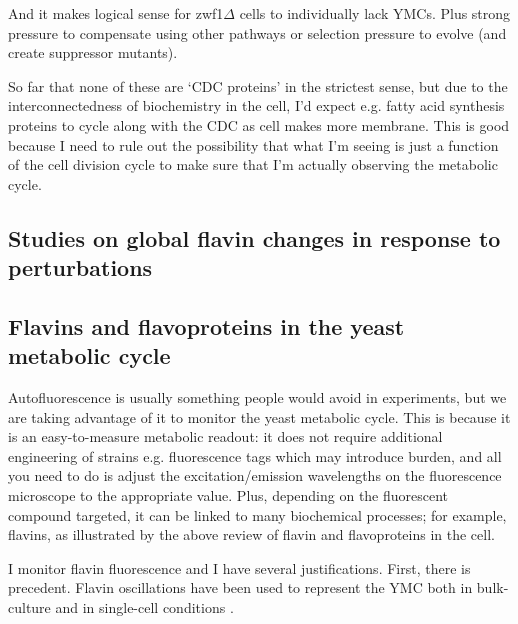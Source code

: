 And it makes logical sense for zwf1$\Delta{}$ cells to individually lack YMCs. Plus strong pressure to compensate using other pathways or selection pressure to evolve (and create suppressor mutants).

So far that none of these are `CDC proteins' in the strictest sense, but due to the interconnectedness of biochemistry in the cell, I'd expect e.g. fatty acid synthesis proteins to cycle along with the CDC as cell makes more membrane.
This is good because I need to rule out the possibility that what I'm seeing is just a function of the cell division cycle to make sure that I'm actually observing the metabolic cycle.

\subsection{Studies on global flavin changes in response to perturbations}
\label{subsec:intro-flavin-perturbations}


\subsection{Flavins and flavoproteins in the yeast metabolic cycle}
\label{subsec:intro-flavin-ymc}

Autofluorescence is usually something people would avoid in experiments, but we are taking advantage of it to monitor the yeast metabolic cycle.
This is because it is an easy-to-measure metabolic readout: it does not require additional engineering of strains e.g. fluorescence tags which may introduce burden, and all you need to do is adjust the excitation/emission wavelengths on the fluorescence microscope to the appropriate value.
Plus, depending on the fluorescent compound targeted, it can be linked to many biochemical processes; for example, flavins, as illustrated by the above review of flavin and flavoproteins in the cell.

I monitor flavin fluorescence and I have several justifications.
First, there is precedent.
Flavin oscillations have been used to represent the YMC both in bulk-culture \citep{murrayRedoxRegulationRespiring2011} and in single-cell conditions \citep{baumgartnerFlavinbasedMetabolicCycles2018}.

